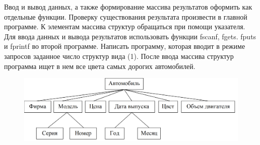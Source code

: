 Ввод и вывод данных, а также формирование массива результатов оформить как отдельные функции. Проверку существования результата произвести в главной программе. К элементам массива структур обращаться при помощи указателя. Для ввода данных и вывода результатов использовать функции fscanf, fgets. fputs и fprintf во второй программе. Написать программу, которая вводит в режиме запросов заданное число структур вида (1). После ввода массива структур программа ищет в нем все цвета самых дорогих автомобилей.
\begin{figure}[h]
    \includegraphics[scale=0.3]{zzz.png}
    \caption{}
\end{figure}
